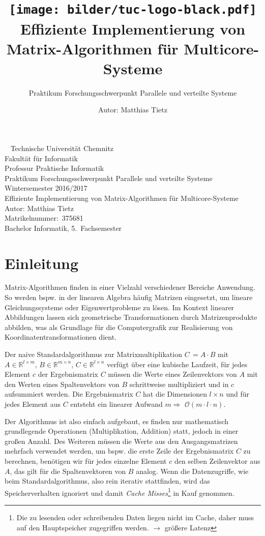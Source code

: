 \documentclass[a4paper,11pt]{scrartcl}
\title{\texttt{[image: bilder/tuc-logo-black.pdf]}
\\Effiziente Implementierung von Matrix-Algorithmen für Multicore-Systeme
}
\subtitle{Praktikum Forschungsschwerpunkt Parallele und verteilte Systeme}
\author{Autor: Matthias Tietz}
\newcommand{\bspw}{\mbox{bspw.}\xspace}
\begin{document}
\maketitle \thispagestyle{empty}

\newpage
\thispagestyle{empty}
~
\vfill
Technische Universität Chemnitz\\
Fakultät für Informatik\\
Professur Praktische Informatik\\
Praktikum Forschungsschwerpunkt Parallele und verteilte Systeme\\
Wintersemester 2016/2017\\

Effiziente Implementierung von Matrix-Algorithmen für Multicore-Systeme\\
Autor: Matthias Tietz\\
Matrikelnummer:~375681\\
Bachelor Informatik, 5.~Fachsemester

\newpage \tableofcontents
\newpage

\section{Einleitung}\label{chp:Einleitung}
Matrix-Algorithmen finden in einer Vielzahl verschiedener Bereiche Anwendung.
So werden \bspw in der linearen Algebra häufig Matrizen eingesetzt, um lineare Gleichungssysteme oder Eigenwertprobleme zu lösen. Im Kontext linearer Abbildungen lassen sich geometrische Transformationen
durch Matrizenprodukte abbilden, was als Grundlage für die Computergrafik zur Realisierung von Koordinatentransformationen dient.\newline

Der naive Standardalgorithmus zur Matrixmultiplikation 
$C\,= A \cdot B$ mit $A \in \mathbb{R}^{l \times m}$, $B \in \mathbb{R}^{m \times n}$,
$C \in \mathbb{R}^{l \times n}$ verfügt über eine kubische Laufzeit, für jedes Element $c$ der 
Ergebnismatrix $C$ müssen die Werte eines Zeilenvektors von $A$ mit den Werten eines Spaltenvektors
von $B$ schrittweise multipliziert und in $c$ aufsummiert werden. Die Ergebnismatrix $C$
hat die Dimensionen $l \times n$ und für jedes Element aus $C$ entsteht ein linearer Aufwand
$m \Rightarrow$ $\mathcal{O}(m \cdot l \cdot n)$.\newline

Der Algorithmus ist also einfach aufgebaut, es finden nur mathematisch grundlegende Operationen
(Multiplikation, Addition) statt, jedoch in einer großen Anzahl. 
Des Weiteren müssen die Werte aus den Ausgangsmatrizen mehrfach verwendet werden, um \bspw die erste Zeile der Ergebnismatrix $C$ zu berechnen,
benötigen wir für jedes einzelne Element $c$ den selben Zeilenvektor aus $A$, das gilt für die
Spaltenvektoren von $B$ analog.
Wenn die Datenzugriffe, wie beim Standardalgorithmus, also rein iterativ stattfinden,
wird das Speicherverhalten ignoriert und damit \emph{Cache Misses}\footnote{Die zu lesenden oder
schreibenden Daten liegen nicht im Cache, daher muss auf den Hauptspeicher zugegriffen werden.
$\rightarrow$ größere Latenz}
 in Kauf genommen. \newline
\end{document}
